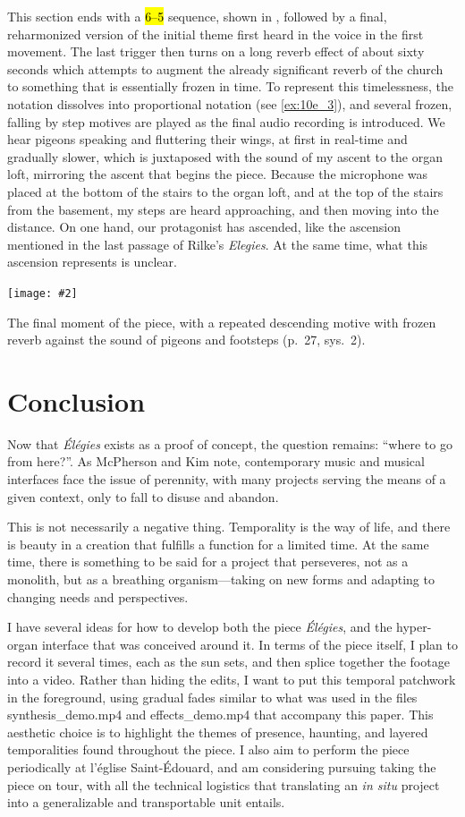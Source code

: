 \documentclass[12pt,twoside,maitrise]{dms_ks}
\newcommand{\customincludeexamples}[4][]{%
    \begin{example}[H]
        \centering
        \texttt{[image: \#2]}
        \caption{#4}
	\label{#3} 
    \end{example}
}
\theoremstyle{definition}
\begin{document}
{This section ends with a \hl{6--5} sequence, shown in , followed by a final, reharmonized version of the initial theme first heard in the voice in the first movement. 
The last trigger then turns on a long reverb effect of about sixty seconds which attempts to augment the already significant reverb of the church to something that is essentially frozen in time. 
To represent this timelessness, the notation dissolves into proportional notation (see \cref{ex:10e_3}), and several frozen, falling by step motives are played as the final audio recording is introduced. 
We hear pigeons speaking and fluttering their wings, at first in real-time and gradually slower, which is juxtaposed with the sound of my ascent to the organ loft, mirroring the ascent that begins the piece. 
Because the microphone was placed at the bottom of the stairs to the organ loft, and at the top of the stairs from the basement, my steps are heard approaching, and then moving into the distance. 
On one hand, our protagonist has ascended, like the ascension mentioned in the last passage of Rilke's \textit{Elegies}. 
At the same time, what this ascension represents is unclear.

\customincludeexamples[width=\textwidth]{10e_3}{ex:10e_3}{The final moment of the piece, with a repeated descending motive with frozen reverb against the sound of pigeons and footsteps (p.~27, sys.~2).}

\chapter*{Conclusion}

Now that \textit{Élégies} exists as a proof of concept, the question remains: “where to go from here?”.
As McPherson and Kim note, contemporary music and musical interfaces face the issue of perennity, with many projects serving the means of a given context, only to fall to disuse and abandon. 

This is not necessarily a negative thing.
Temporality is the way of life, and there is beauty in a creation that fulfills a function for a limited time.
At the same time, there is something to be said for a project that perseveres, not as a monolith, but as a breathing organism---taking on new forms and adapting to changing needs and perspectives.   

I have several ideas for how to develop both the piece \textit{Élégies}, and the hyper-organ interface that was conceived around it. 
In terms of the piece itself, I plan to record it several times, each as the sun sets, and then splice together the footage into a video.
Rather than hiding the edits, I want to put this temporal patchwork in the foreground, using gradual fades similar to what was used in the files synthesis\_demo.mp4 and effects\_demo.mp4 that accompany this paper.
This aesthetic choice is to highlight the themes of presence, haunting, and layered temporalities found throughout the piece.
I also aim to perform the piece periodically at l'église Saint-Édouard, and am considering pursuing taking the piece on tour, with all the technical logistics that translating an \textit{in situ} project into a generalizable and transportable unit entails.

}
\end{document}
